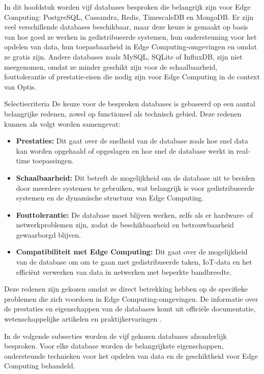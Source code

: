 In dit hoofdstuk worden vijf databases besproken die belangrijk zijn voor Edge Computing: PostgreSQL, Cassandra, Redis, TimescaleDB en MongoDB. Er zijn veel verschillende databases beschikbaar, maar deze keuze is gemaakt op basis van hoe goed ze werken in gedistribueerde systemen, hun ondersteuning voor het opdelen van data, hun toepasbaarheid in Edge Computing-omgevingen en omdat ze gratis zijn. Andere databases zoals MySQL, SQLite of InfluxDB, zijn niet meegenomen, omdat ze minder geschikt zijn voor de schaalbaarheid, fouttolerantie of prestatie-eisen die nodig zijn voor Edge Computing in de context van Optis.

Selectiecriteria
De keuze voor de besproken databases is gebaseerd op een aantal belangrijke redenen, zowel op functioneel als technisch gebied. Deze redenen kunnen als volgt worden samengevat:

\begin{itemize} 
    \item \textbf{Prestaties:} Dit gaat over de snelheid van de database zoals hoe snel data kan worden opgehaald of opgeslagen en hoe snel de database werkt in real-time toepassingen. 
    \item \textbf{Schaalbaarheid:} Dit betreft de mogelijkheid om de database uit te breiden door meerdere systemen te gebruiken, wat belangrijk is voor gedistribueerde systemen en de dynamische structuur van Edge Computing. 
    \item \textbf{Fouttolerantie:} De database moet blijven werken, zelfs als er hardware- of netwerkproblemen zijn, zodat de beschikbaarheid en betrouwbaarheid gewaarborgd blijven. 
    \item \textbf{Compatibiliteit met Edge Computing:} Dit gaat over de mogelijkheid van de database om om te gaan met gedistribueerde taken, IoT-data en het efficiënt verwerken van data in netwerken met beperkte bandbreedte. 
\end{itemize}

Deze redenen zijn gekozen omdat ze direct betrekking hebben op de specifieke problemen die zich voordoen in Edge Computing-omgevingen. De informatie over de prestaties en eigenschappen van de databases komt uit officiële documentatie, wetenschappelijke artikelen en praktijkervaringen \autocite{PostgreSQLDocumentation, CassandraDocumentation, RedisDocumentation, TimescaleDBDocumentation, MongoDBDocumentation}.

In de volgende subsecties worden de vijf gekozen databases afzonderlijk besproken. Voor elke database worden de belangrijkste eigenschappen, ondersteunde technieken voor het opdelen van data en de geschiktheid voor Edge Computing behandeld.

